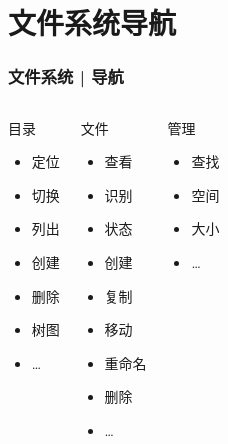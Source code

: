 \section{文件系统导航}
\begin{frame}
  \frametitle{文件系统 | 导航}
  \begin{columns}
    \pause
    \begin{block}{目录}
      \begin{itemize}
        \item 定位
        \item 切换
        \item 列出
        \item 创建
        \item 删除
        \item 树图
        \item \ldots
      \end{itemize}
    \end{block}
    \pause
    \begin{block}{文件}
      \begin{itemize}
        \item 查看
        \item 识别
	\item 状态
        \item 创建
        \item 复制
        \item 移动
        \item 重命名
        \item 删除
        \item \ldots
      \end{itemize}
    \end{block}
    \pause
    \begin{block}{管理}
      \begin{itemize}
        \item 查找
        \item 空间
        \item 大小
        \item \ldots
      \end{itemize}
    \end{block}
  \end{columns}
\end{frame}

